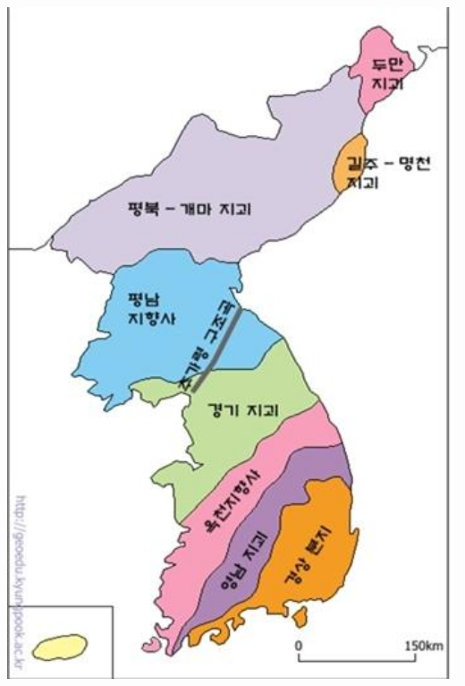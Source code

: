 \documentclass[12pt,a4paper]{book}
\begin{document}
		\newpage
		\includegraphics[width=1.0\textwidth]{./fig/belt-001.jpg}	
\end{document}
